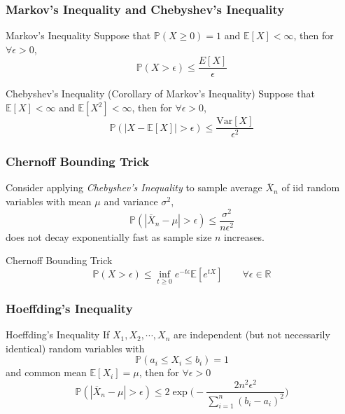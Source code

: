 \documentclass{beamer}
\begin{document}
\begin{frame}
\frametitle{Markov's Inequality and Chebyshev's Inequality} 

\begin{block}{Markov's Inequality}
Suppose that $\mathbb{P}(X \geq 0) = 1$ and $\mathbb{E}[X] < \infty $, then for $\forall \epsilon > 0$, 
$$ \mathbb{P}(X > \epsilon) \leq \frac{E[X]}{\epsilon} $$
\end{block}

\begin{block}{Chebyshev's Inequality (Corollary of Markov's Inequality)}
Suppose that $\mathbb{E}[X] < \infty $ and $\mathbb{E}[X^2] < \infty $, then for $\forall \epsilon > 0$, 
$$ \mathbb{P}(|X - \mathbb{E}[X]| > \epsilon) \leq \frac{\text{Var}[X]}{\epsilon^2} $$
\end{block}

\end{frame}


\begin{frame}
\frametitle{Chernoff Bounding Trick} 

Consider applying \textit{Chebyshev's Inequality} to sample average $\overline{X}_n$ of iid random variables with mean $\mu$ and variance $\sigma^2$, 
$$ \mathbb{P}(|\overline{X}_n - \mu| > \epsilon) \leq \frac{\sigma^2}{n\epsilon^2} $$
does not decay exponentially fast as sample size $n$ increases. 

\begin{block}{Chernoff Bounding Trick}
$$ \mathbb{P}(X > \epsilon) \leq \inf_{t \geq 0} e^{-t\epsilon}\mathbb{E}[e^{tX}] \qquad \forall \epsilon \in \mathbb{R} $$
\end{block}

\end{frame}


\begin{frame}
\frametitle{Hoeffding's Inequality} 

\begin{block}{Hoeffding's Inequality}
If $X_1, X_2, \cdots, X_n$ are independent (but not necessarily identical) random variables with 
$$ \mathbb{P}(a_i \leq X_i \leq b_i) = 1 $$
and common mean $\mathbb{E}[X_i] = \mu$, then for $\forall \epsilon > 0$ 
$$ \mathbb{P}(|\overline{X}_n - \mu| > \epsilon) \leq 2 \exp \bigg( -\frac{2n^2\epsilon^2}{\sum_{i=1}^{n} (b_i - a_i)^2} \bigg) $$
\end{block}

\end{frame}
\end{document}
